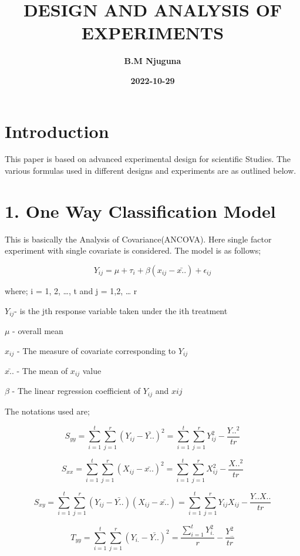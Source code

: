 \documentclass[
]{article}
\title{\textbf{DESIGN AND ANALYSIS OF EXPERIMENTS}}
\author{\textbf{B.M Njuguna}}
\date{\textbf{2022-10-29}}
\begin{document}
\maketitle

\newpage
\tableofcontents
\newpage

\hypertarget{introduction}{%
\section{Introduction}\label{introduction}}

This paper is based on advanced experimental design for scientific
Studies. The various formulas used in different designs and experiments
are as outlined below.

\hypertarget{one-way-classification-model}{%
\section{1. One Way Classification
Model}\label{one-way-classification-model}}

This is basically the Analysis of Covariance(ANCOVA). Here single factor
experiment with single covariate is considered. The model is as follows;

\[Y_{ij} = \mu+\tau_i+\beta(x_{ij}-\bar{x..} )+ \epsilon_{ij}\]

where; i = 1, 2, \ldots, t and j = 1,2, \ldots{} r

\(Y_{ij}\)- is the jth response variable taken under the ith treatment

\(\mu\) - overall mean

\(x_{ij}\) - The measure of covariate corresponding to \(Y_{ij}\)

\(\bar{x..}\) - The mean of \(x_{ij}\) value

\(\beta\) - The linear regression coefficient of \(Y_{ij}\) and
\(x{ij}\)

The notations used are;

\[S_{yy}=\sum_{i=1}^t\sum_{j=1}^r(Y_{ij}-\bar{Y..})^2=\sum_{i=1}^t\sum_{j=1}^rY_{ij}^2-\frac{Y..^2}{tr}\]

\[S_{xx}=\sum_{i=1}^t\sum_{j=1}^r(X_{ij}-\bar{x..})^2=\sum_{i=1}^t\sum_{j=1}^rX_{ij}^2-\frac{X..^2}{tr}\]

\[S_{xy}=\sum_{i=1}^t\sum_{j=1}^r(Y_{ij}-\bar{Y..})(X_{ij}-\bar{x..})=\sum_{i=1}^t\sum_{j=1}^rY_{ij}X_{ij}-\frac{Y..X..}{tr}\]

\[T_{yy}=\sum_{i=1}^t\sum_{j=1}^r(Y_{i.}-\bar{Y..})^2=\frac{\sum_{i=1}^tY_{i.}^2}{r}-\frac{Y_{..}^2}{tr}\]
\end{document}
